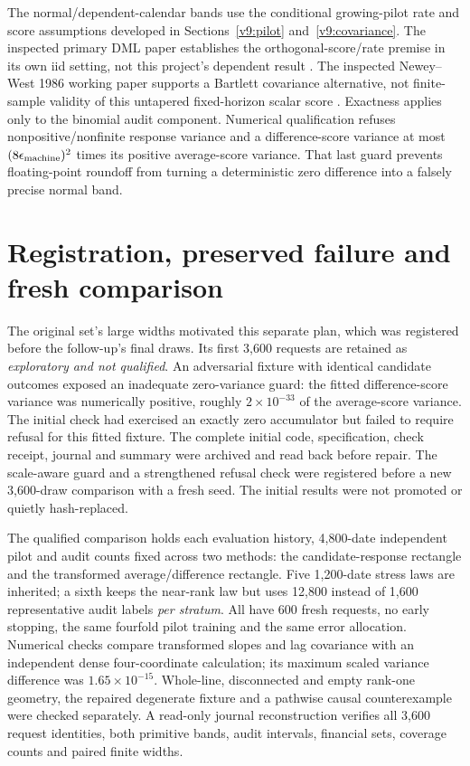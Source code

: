 The normal/dependent-calendar bands use the conditional growing-pilot rate
and score assumptions developed in Sections~\ref{v9:pilot} and~\ref{v9:covariance}. The inspected
primary DML paper establishes the orthogonal-score/rate premise in its own
iid setting, not this project's dependent result \cite{dml2018}. The
inspected Newey--West 1986 working paper supports a Bartlett covariance
alternative, not finite-sample validity of this untapered fixed-horizon
scalar score \cite{newey1986}. Exactness applies only to the binomial audit
component. Numerical qualification refuses nonpositive/nonfinite response
variance and a difference-score variance at most
$(8\epsilon_{\rm machine})^2$ times its positive average-score variance.
That last guard prevents floating-point roundoff from turning a deterministic
zero difference into a falsely precise normal band.

\section{Registration, preserved failure and fresh comparison}

The original set's large widths motivated this separate plan, which was
registered before the follow-up's final draws. Its first 3,600 requests are
retained as \emph{exploratory and not qualified}. An adversarial fixture with
identical candidate outcomes exposed an inadequate zero-variance guard: the
fitted difference-score variance was numerically positive, roughly
$2\times10^{-33}$ of the average-score variance. The initial check had
exercised an exactly zero accumulator but failed to require refusal for this
fitted fixture. The complete initial code, specification, check receipt,
journal and summary were archived and read back before repair. The scale-aware
guard and a strengthened refusal check were registered before a new 3,600-draw
comparison with a fresh seed. The initial results were not promoted or
quietly hash-replaced.

The qualified comparison holds each evaluation history, 4,800-date independent
pilot and audit counts fixed across two methods: the candidate-response
rectangle and the transformed average/difference rectangle. Five 1,200-date
stress laws are inherited; a sixth keeps the near-rank law but uses 12,800
instead of 1,600 representative audit labels \emph{per stratum}. All have
600 fresh requests, no early stopping, the same fourfold pilot training and
the same error allocation. Numerical checks compare transformed slopes and
lag covariance with an independent dense four-coordinate calculation; its
maximum scaled variance difference was $1.65\times10^{-15}$. Whole-line,
disconnected and empty rank-one geometry, the repaired degenerate fixture and
a pathwise causal counterexample were checked separately. A read-only journal
reconstruction verifies all 3,600 request identities, both primitive bands,
audit intervals, financial sets, coverage counts and paired finite widths.

